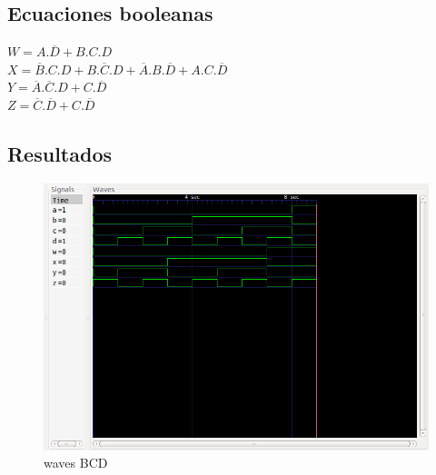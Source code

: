 \subsection*{Ecuaciones booleanas}
$W=A.\overline{D}+B.C.D$\\
$X=\overline{B}.C.D+B.\overline{C}.D+\overline{A}.B.\overline{D}+A.C.\overline{D}$\\
$Y=\overline{A}.\overline{C}.D+C.\overline{D}$\\
$Z=\overline{C}.\overline{D}+C.\overline{D}$\\

\subsection*{Resultados}
\begin{figure}[h]
    \centering
    \includegraphics[scale=0.6]{fotos/resultados/arki-DECIMAL.png}
    \caption{waves BCD}
\end{figure}